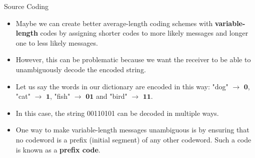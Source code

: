 \documentclass[11pt,compress,t,notes=noshow, xcolor=table]{beamer}
\begin{document}
\begin{vbframe} {Source Coding}
\begin{itemize}
  \end{itemize}
  
\framebreak

\begin{itemize}
  \item Maybe we can create better average-length coding schemes with \textbf{variable-length} codes by assigning shorter codes to more likely messages and longer one to less likely messages.
  \item However, this can be problematic because we want the receiver to be able to unambiguously decode the encoded string.
  \item Let us say the words in our dictionary are encoded in this way: "dog" $\rightarrow$ $\mathbf{0}$, "cat" $\rightarrow$ $\mathbf{1}$, "fish" $\rightarrow$ $\mathbf{01}$ and "bird" $\rightarrow$ $\mathbf{11}$.
  \item In this case, the string 00110101 can be decoded in multiple ways.
  \begin{figure}
    \centering
  \end{figure}
    \item One way to make variable-length messages unambiguous is by ensuring that no codeword is a prefix (initial segment) of any other codeword. Such a code is known as a \textbf{prefix code}.
\end{itemize}

\framebreak


\end{vbframe}
\end{document}
